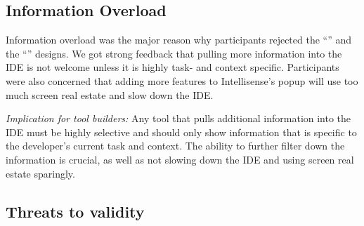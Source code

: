 \moarsauce
\subsection{Information Overload} 

Information overload was the major reason why participants rejected the ``\ZoomableUML'' and the ``\RichIntellisense'' designs. We got strong feedback that pulling more information into the IDE is not welcome unless it is highly task- and context specific. Participants were also concerned that adding more features to Intellisense's popup will use too much screen real estate and slow down the IDE. 

\emph{Implication for tool builders:} Any tool that pulls additional information into the IDE must be highly selective and should only show information that is specific to the developer's current task and context. The ability to further filter down the information is crucial, as well as not slowing down the IDE and using screen real estate sparingly.





\moarsauce
\subsection{Threats to validity}

